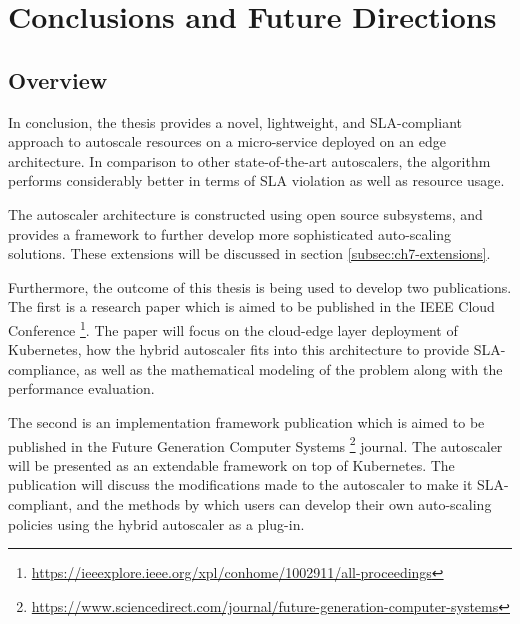 \clearpage

\def\chaptertitle{Conclusions and Future Directions}

\lhead{\emph{\chaptertitle}}

\chapter{\chaptertitle}
\label{ch:conclusion}

\section{Overview}
\label{sec:ch7-overview}

In conclusion, the thesis provides a novel, lightweight, and SLA-compliant approach to autoscale resources on a micro-service deployed on an edge architecture. In comparison to other state-of-the-art autoscalers, the algorithm performs considerably better in terms of SLA violation as well as resource usage.\par

The autoscaler architecture is constructed using open source subsystems, and provides a framework to further develop more sophisticated auto-scaling solutions. These extensions will be discussed in section \ref{subsec:ch7-extensions}.\par

Furthermore, the outcome of this thesis is being used to develop two publications. The first is a research paper which is aimed to be published in the IEEE Cloud Conference \footnote{\url{https://ieeexplore.ieee.org/xpl/conhome/1002911/all-proceedings}}. The paper will focus on the cloud-edge layer deployment of Kubernetes, how the hybrid autoscaler fits into this architecture to provide SLA-compliance, as well as the mathematical modeling of the problem along with the performance evaluation.\par

The second is an implementation framework publication which is aimed to be published in the Future Generation Computer Systems \footnote{\url{https://www.sciencedirect.com/journal/future-generation-computer-systems}} journal. The autoscaler will be presented as an extendable framework on top of Kubernetes. The publication will discuss the modifications made to the autoscaler to make it SLA-compliant, and the methods by which users can develop their own auto-scaling policies using the hybrid autoscaler as a plug-in.\par

